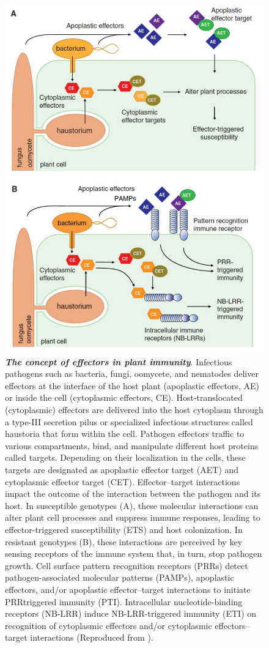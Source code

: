 \documentclass[12pt,]{book}
\theoremstyle{definition}
\theoremstyle{definition}
\theoremstyle{remark}
\begin{document}
\begin{figure}
\includegraphics[width=4.75in]{assets/eff} \caption{\textbf{\emph{The concept of effectors in plant immunity}}.
Infectious pathogens such as bacteria, fungi, oomycete, and nematodes
deliver effectors at the interface of the host plant (apoplastic
effectors, AE) or inside the cell (cytoplasmic effectors, CE).
Host-translocated (cytoplasmic) effectors are delivered into the host
cytoplasm through a type-III secretion pilus or specialized infectious
structures called haustoria that form within the cell. Pathogen
effectors traffic to various compartments, bind, and manipulate
different host proteins called targets. Depending on their localization
in the cells, these targets are designated as apoplastic effector target
(AET) and cytoplasmic effector target (CET). Effector--target
interactions impact the outcome of the interaction between the pathogen
and its host. In susceptible genotypes (A), these molecular interactions
can alter plant cell processes and suppress immune responses, leading to
effector-triggered susceptibility (ETS) and host colonization. In
resistant genotypes (B), these interactions are perceived by key sensing
receptors of the immune system that, in turn, stop pathogen growth. Cell
surface pattern recognition receptors (PRRs) detect pathogen-associated
molecular patterns (PAMPs), apoplastic effectors, and/or apoplastic
effector--target interactions to initiate PRRtriggered immunity (PTI).
Intracellular nucleotide-binding receptors (NB-LRR) induce
NB-LRR-triggered immunity (ETI) on recognition of cytoplasmic effectors
and/or cytoplasmic effectors--target interactions (Reproduced from
\citet{Win:2012jd}).}\label{fig:maineff}
\end{figure}
\end{document}
